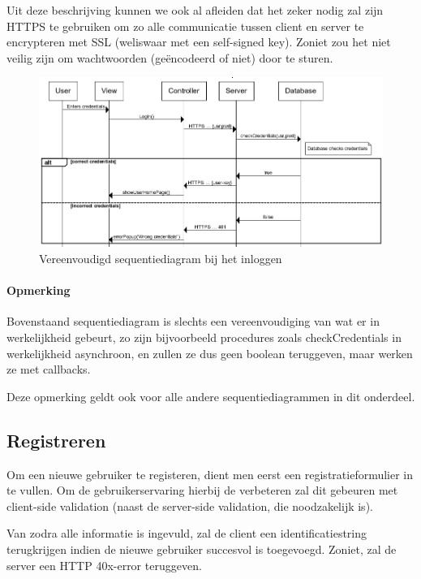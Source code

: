 \documentclass{article}
\begin{document}
Uit deze beschrijving kunnen we ook al afleiden dat het zeker nodig zal zijn HTTPS te gebruiken om zo alle communicatie tussen client en server te encrypteren met SSL (weliswaar met een self-signed key). Zoniet zou het niet veilig zijn om wachtwoorden (ge\"encodeerd of niet) door te sturen.

\begin{figure}[!h]
\centering
 \includegraphics[width=145mm]{login-sequence.png}
 \caption{Vereenvoudigd sequentiediagram bij het inloggen}
 \label{login-sequence}
\end{figure}

\paragraph{Opmerking}

Bovenstaand sequentiediagram is slechts een vereenvoudiging van wat er in werkelijkheid gebeurt, zo zijn bijvoorbeeld procedures zoals checkCredentials in werkelijkheid asynchroon, en zullen ze dus geen boolean teruggeven, maar werken ze met callbacks.

Deze opmerking geldt ook voor alle andere sequentiediagrammen in dit onderdeel.

\subsection{Registreren}

Om een nieuwe gebruiker te registeren, dient men eerst een registratieformulier in te vullen. Om de gebruikerservaring hierbij de verbeteren zal dit gebeuren met client-side validation (naast de server-side validation, die noodzakelijk is). 

Van zodra alle informatie is ingevuld, zal de client een identificatiestring terugkrijgen indien de nieuwe gebruiker succesvol is toegevoegd. Zoniet, zal de server een HTTP 40x-error teruggeven.
\end{document}
